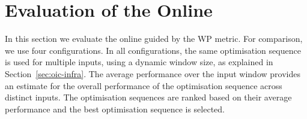 \section{Evaluation of the Online {\IterComp}}


In this section we evaluate the online {\itercomp} guided by the WP metric.
For comparison, we use four configurations.
In all configurations, the same optimisation sequence is used for multiple inputs, using a dynamic window size, as explained in Section~\ref{sec:oic-infra}.
The average performance over the input window provides an estimate for the overall performance of the optimisation sequence across distinct inputs.
The optimisation sequences are ranked based on their average performance and the best optimisation sequence is selected.
